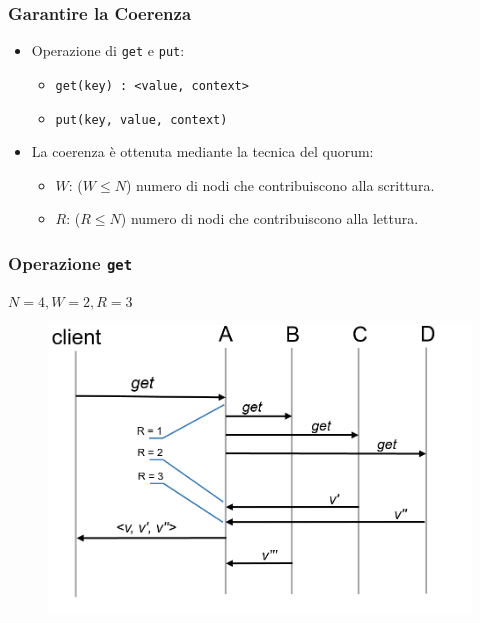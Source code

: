 \begin{frame}
  \frametitle{Garantire la Coerenza}
  \begin{itemize}
  \item Operazione di \texttt{get} e \texttt{put}:
    \begin{itemize}
    \item \texttt{get(key) : <value, context>}
    \item \texttt{put(key, value, context)}
    \end{itemize}
  \end{itemize}
  \begin{itemize}
  \item La coerenza è ottenuta mediante la tecnica del \alert{quorum}:
    \begin{itemize}
    \item $W$: ($W \leq N$) numero di nodi che contribuiscono alla scrittura.
    \item $R$: ($R \leq N$) numero di nodi che contribuiscono alla lettura.
    \end{itemize}
  \end{itemize}
\end{frame}


\begin{frame}
  \frametitle{Operazione \texttt{get}}
  $N = 4, W = 2, R = 3$
  \begin{figure}
  \centering
  \includegraphics[scale=0.38]{dynamo/get.png}
  \end{figure}
\end{frame}


